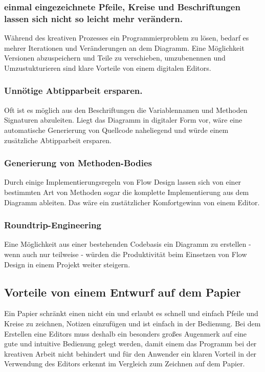 \documentclass[11pt]{article}
\begin{document}
\subsubsection{einmal eingezeichnete Pfeile, Kreise und Beschriftungen lassen sich nicht so leicht mehr verändern.}
\label{sec:orgheadline2}
Während des kreativen Prozesses ein Programmierproblem zu lösen, bedarf es
mehrer Iterationen und Veränderungen an dem Diagramm. Eine Möglichkeit Versionen
abzuspeichern und Teile zu verschieben, umzubenennen und Umzustukturieren sind
klare Vorteile von einem digitalen Editors.
\subsubsection{Unnötige Abtipparbeit ersparen.}
\label{sec:orgheadline3}
Oft ist es möglich aus den Beschriftungen die Variablennamen und
Methoden Signaturen abzuleiten. Liegt das Diagramm in digitaler Form vor, wäre eine automatische Generierung von Quellcode naheliegend und
würde einem zusätzliche Abtipparbeit ersparen.
\subsubsection{Generierung von Methoden-Bodies}
\label{sec:orgheadline4}
Durch einige Implementierungsregeln von Flow Design lassen sich von einer
bestimmten Art von Methoden sogar die komplette Implementierung aus dem Diagramm
ableiten. Das wäre ein zustätzlicher Komfortgewinn von einem Editor.
\subsubsection{Roundtrip-Engineering}
\label{sec:orgheadline5}
Eine Möglichkeit aus einer bestehenden Codebasis ein Diagramm zu erstellen -
wenn auch nur teilweise - würden die Produktivität beim Einsetzen von Flow
Design in einem Projekt weiter steigern.

\subsection{Vorteile von einem Entwurf auf dem Papier}
\label{sec:orgheadline7}
Ein Papier schränkt einen nicht ein und erlaubt es schnell und einfach Pfeile
und Kreise zu zeichnen, Notizen einzufügen und ist einfach in der Bedienung.
Bei dem Erstellen eine Editors muss deshalb ein besonders großes Augenmerk auf
eine gute und intuitive Bedienung gelegt werden, damit einem das Programm bei der kreativen Arbeit nicht
behindert und für den Anwender ein klaren Vorteil in der Verwendung des Editors
erkennt im Vergleich zum Zeichnen auf dem Papier.
\end{document}
